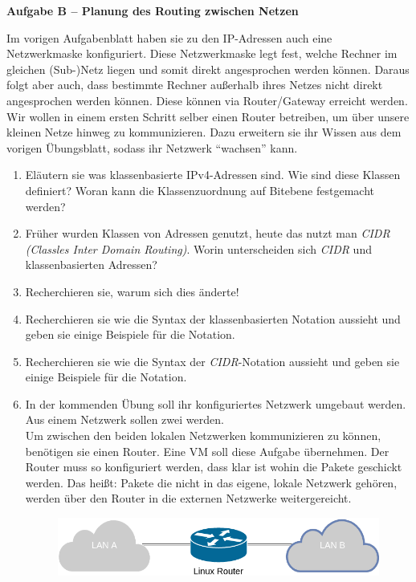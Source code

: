 \documentclass[paper=a4,fontsize=11pt]{scrartcl}%
\numberwithin{equation}{section}
\begin{document}
\begin{center}
\Large{\textbf{Aufgabe B -- Planung des Routing zwischen Netzen}}
\end{center}
\vskip0.25in
Im vorigen Aufgabenblatt haben sie zu den IP-Adressen auch eine Netzwerkmaske konfiguriert. Diese Netzwerkmaske legt fest, welche Rechner im gleichen (Sub-)Netz liegen und somit direkt angesprochen werden können. Daraus folgt aber auch, dass bestimmte Rechner außerhalb ihres Netzes nicht direkt angesprochen werden können. Diese können via Router/Gateway erreicht werden.\\
Wir wollen in einem ersten Schritt selber einen Router betreiben, um über unsere kleinen Netze hinweg zu kommunizieren. Dazu erweitern sie ihr Wissen aus dem vorigen Übungsblatt, sodass ihr Netzwerk \enquote{wachsen} kann.
\begin{enumerate}
	\item Eläutern sie was klassenbasierte IPv4-Adressen sind. Wie sind diese Klassen definiert? Woran kann die Klassenzuordnung auf Bitebene festgemacht werden?
	\item Früher wurden Klassen von Adressen genutzt, heute das nutzt man \emph{CIDR (Classles Inter Domain Routing)}. Worin unterscheiden sich \emph{CIDR} und klassenbasierten Adressen?
	\item Recherchieren sie, warum sich dies änderte!
	\item Recherchieren sie wie die Syntax der klassenbasierten Notation aussieht und geben sie einige Beispiele für die Notation.
	\item Recherchieren sie wie die Syntax der \emph{CIDR}-Notation aussieht und geben sie einige Beispiele für die Notation.
	\item In der kommenden Übung soll ihr konfiguriertes Netzwerk umgebaut werden. Aus einem Netzwerk sollen zwei werden.\\
	Um zwischen den beiden lokalen Netzwerken kommunizieren zu können, benötigen sie einen Router. Eine VM soll diese Aufgabe übernehmen. Der Router muss so konfiguriert werden, dass klar ist wohin die Pakete geschickt werden. Das heißt: Pakete die nicht in das eigene, lokale Netzwerk gehören, werden über den Router in die externen Netzwerke weitergereicht.
	\begin{figure}[h]
	\centering
	\includegraphics[scale=0.35]{lan}

\end{figure}
\end{enumerate}
\end{document}
